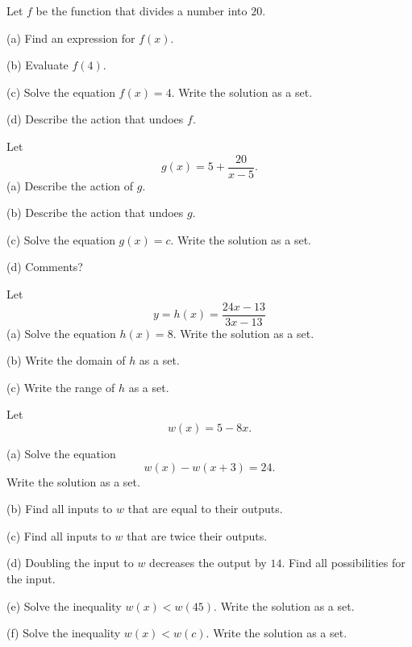 \documentclass{ximera}
\begin{document}
\begin{question}  \label{Q7384fgrr}
Let $f$ be the function that divides a number into $20$.

(a) Find an expression for $f(x)$.

(b) Evaluate $f(4)$.

(c) Solve the equation $f(x)=4$. Write the solution as a set.

(d) Describe the action that undoes $f$.

\end{question}


\begin{question}  \label{Qerdfr3r33}
Let
\[
   g(x) = 5+ \frac{20}{x-5} .
\]
(a) Describe the action of $g$.

(b) Describe the action that undoes $g$.

(c) Solve the equation $g(x)=c$. Write the solution as a set.

(d) Comments?
\end{question}

\begin{question}  \label{QPodfierer}
Let
\[
     y= h(x) = \frac{24x-13}{3x-13}
\] 
(a) Solve the equation $h(x)=8$. Write the solution as a set.

(b) Write the domain of $h$ as a set.

(c) Write the range of $h$ as a set.
\end{question}

\begin{question}  \label{Qfk435r4}
Let
\[
        w(x) = 5-8x .
\]

(a) Solve the equation
\[
    w(x) - w(x+3) = 24 .
\]
Write the solution as a set.

(b) Find all inputs to $w$ that are equal to their outputs.

(c) Find all inputs to $w$ that are twice their outputs.

(d) Doubling the input to $w$ decreases the output by $14$. Find all possibilities for the input.

(e) Solve the inequality $w(x)< w(45)$. Write the solution as a set.

(f) Solve the inequality $w(x) < w(c)$. Write the solution as a set.

\end{question}
\end{document}
